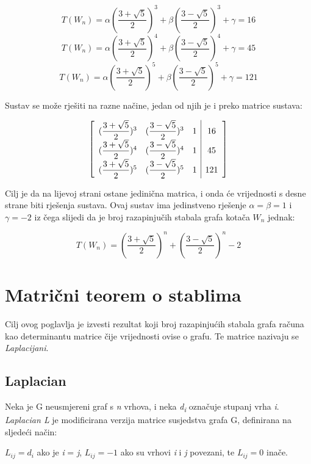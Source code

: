 \documentclass[times, utf8, zavrsni]{fer}
\begin{document}
\[T(W_n) = \alpha(\dfrac{3 + \sqrt{5}}{2})^3 + \beta(\dfrac{3 - \sqrt{5}}{2})^3 + \gamma = 16\]
\[T(W_n) = \alpha(\dfrac{3 + \sqrt{5}}{2})^4 + \beta(\dfrac{3 - \sqrt{5}}{2})^4 + \gamma = 45\]
\[T(W_n) = \alpha(\dfrac{3 + \sqrt{5}}{2})^5 + \beta(\dfrac{3 - \sqrt{5}}{2})^5 + \gamma = 121\]

Sustav se može rješiti na razne načine, jedan od njih je i preko matrice sustava:

\[
\centering 
\begin{bmatrix}
	\begin{array}{ccc|c}
		(\dfrac{3 + \sqrt{5}}{2})^3 & (\dfrac{3 - \sqrt{5}}{2})^3 & 1 & 16 \\
		(\dfrac{3 + \sqrt{5}}{2})^4 & (\dfrac{3 - \sqrt{5}}{2})^4 & 1 & 45 \\
		(\dfrac{3 + \sqrt{5}}{2})^5 & (\dfrac{3 - \sqrt{5}}{2})^5 & 1 & 121 \\
	\end{array}
\end{bmatrix}
\]

Cilj je da na lijevoj strani ostane jedinična matrica, i onda će vrijednosti s desne strane biti rješenja sustava. Ovaj sustav ima jedinstveno rješenje $\alpha = \beta = 1$ i $\gamma = -2$ iz čega slijedi da je broj razapinjučih stabala grafa kotača $W_n$ jednak:

\begin{equation}
T(W_n) = (\dfrac{3 + \sqrt{5}}{2})^n + (\dfrac{3 - \sqrt{5}}{2})^n - 2
\end{equation}

\chapter{Matrični teorem o stablima}

Cilj ovog poglavlja je izvesti rezultat koji broj razapinjućih stabala grafa računa kao determinantu matrice čije vrijednosti ovise o grafu. Te matrice nazivaju se \textit{Laplacijani}.

\section{Laplacian}

Neka je G neusmjereni graf s \textit{n} vrhova, i neka \textit{d\textsubscript{i}} označuje stupanj vrha \textit{i}. \textit{Laplacian L} je modificirana verzija matrice susjedstva grafa G, definirana na sljedeći način:

$L_{ij} = d_i$ ako je \textit{i} = \textit{j}, $L_{ij} = -1$ ako su vrhovi \textit{i} i \textit{j} povezani, te $L_{ij} = 0$ inače.
\end{document}
